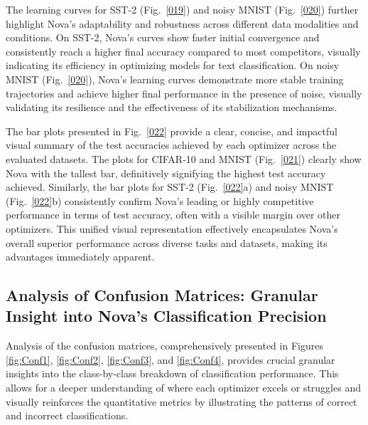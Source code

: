 \documentclass{article}
\begin{document}
The learning curves for SST-2 (Fig.~\ref{019}) and noisy MNIST (Fig.~\ref{020}) further highlight Nova's adaptability and robustness across different data modalities and conditions. On SST-2, Nova's curves show faster initial convergence and consistently reach a higher final accuracy compared to most competitors, visually indicating its efficiency in optimizing models for text classification. On noisy MNIST (Fig.~\ref{020}), Nova's learning curves demonstrate more stable training trajectories and achieve higher final performance in the presence of noise, visually validating its resilience and the effectiveness of its stabilization mechanisms.

The bar plots presented in Fig.~\ref{022} provide a clear, concise, and impactful visual summary of the test accuracies achieved by each optimizer across the evaluated datasets. The plots for CIFAR-10 and MNIST (Fig.~\ref{021}) clearly show Nova with the tallest bar, definitively signifying the highest test accuracy achieved. Similarly, the bar plots for SST-2 (Fig.~\ref{022}a) and noisy MNIST (Fig.~\ref{022}b) consistently confirm Nova's leading or highly competitive performance in terms of test accuracy, often with a visible margin over other optimizers. This unified visual representation effectively encapsulates Nova's overall superior performance across diverse tasks and datasets, making its advantages immediately apparent.

\subsection{Analysis of Confusion Matrices: Granular Insight into Nova's Classification Precision}

Analysis of the confusion matrices, comprehensively presented in Figures \ref{fig:Conf1}, \ref{fig:Conf2}, \ref{fig:Conf3}, and \ref{fig:Conf4}, provides crucial granular insights into the class-by-class breakdown of classification performance. This allows for a deeper understanding of where each optimizer excels or struggles and visually reinforces the quantitative metrics by illustrating the patterns of correct and incorrect classifications.
\end{document}
